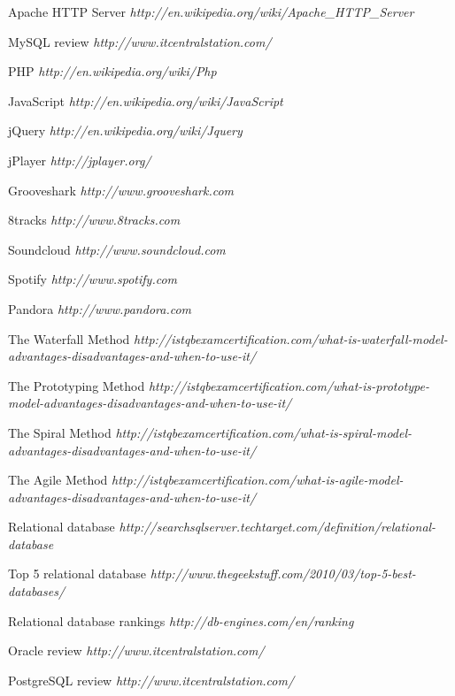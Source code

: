 \documentclass[a4paper, 12pt]{report}
\begin{document}
\clearpage
\begin{thebibliography}{9}
Apache HTTP Server \emph{ http://en.wikipedia.org/wiki/Apache\_HTTP\_Server}

MySQL review \emph{http://www.itcentralstation.com/}

PHP \emph{http://en.wikipedia.org/wiki/Php}

JavaScript \emph{http://en.wikipedia.org/wiki/JavaScript}

jQuery \emph{http://en.wikipedia.org/wiki/Jquery}

jPlayer \emph{http://jplayer.org/}

Grooveshark \emph{ http://www.grooveshark.com} 

8tracks \emph{ http://www.8tracks.com} 

Soundcloud \emph{ http://www.soundcloud.com} 

Spotify \emph{ http://www.spotify.com} 

Pandora \emph{ http://www.pandora.com}

The Waterfall Method \emph{http://istqbexamcertification.com/what-is-waterfall-model-advantages-disadvantages-and-when-to-use-it/}

The Prototyping Method \emph{http://istqbexamcertification.com/what-is-prototype-model-advantages-disadvantages-and-when-to-use-it/}

The Spiral Method \emph{http://istqbexamcertification.com/what-is-spiral-model-advantages-disadvantages-and-when-to-use-it/}

The Agile Method \emph{http://istqbexamcertification.com/what-is-agile-model-advantages-disadvantages-and-when-to-use-it/}

Relational database \emph{http://searchsqlserver.techtarget.com/definition/relational-database}

Top 5 relational database \emph{http://www.thegeekstuff.com/2010/03/top-5-best-databases/}

Relational database rankings \emph{http://db-engines.com/en/ranking}

Oracle review \emph{http://www.itcentralstation.com/}

PostgreSQL review \emph{http://www.itcentralstation.com/}


\end{thebibliography}
\end{document}
